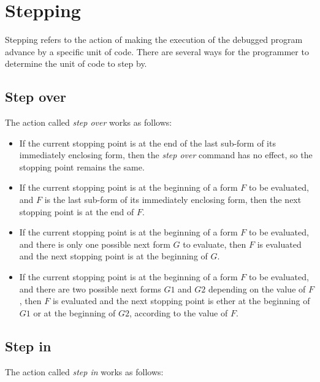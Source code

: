 \chapter{Stepping}

Stepping refers to the action of making the execution of the debugged
program advance by a specific unit of code.  There are several ways
for the programmer to determine the unit of code to step by.

\section{Step over}

The action called \emph{step over} works as follows:

\begin{itemize}
\item If the current stopping point is at the end of the last sub-form
  of its immediately enclosing form, then the \emph{step over} command
  has no effect, so the stopping point remains the same.
\item If the current stopping point is at the beginning of a form $F$
  to be evaluated, and $F$ is the last sub-form of its immediately
  enclosing form, then the next stopping point is at the end of $F$.
\item If the current stopping point is at the beginning of a form $F$
  to be evaluated, and there is only one possible next form $G$ to
  evaluate, then $F$ is evaluated and the next stopping point is at
  the beginning of $G$.
\item If the current stopping point is at the beginning of a form $F$
  to be evaluated, and there are two possible next forms $G1$ and $G2$
  depending on the value of $F$, then $F$ is evaluated and the next
  stopping point is ether at the beginning of $G1$ or at the beginning
  of $G2$, according to the value of $F$.
\end{itemize}

\section{Step in}

The action called \emph{step in} works as follows:

